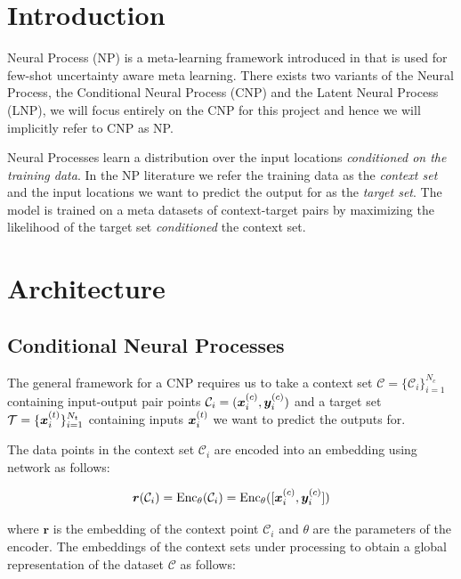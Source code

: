 \documentclass[../../main.tex]{subfiles}
\begin{document}
\section{Introduction}

Neural Process (NP) is a meta-learning framework introduced in \parencite{garnelo2018conditional, garnelo2018neural} that is used for few-shot uncertainty aware meta learning. There exists two variants of the Neural Process, the Conditional Neural Process (CNP) and the Latent Neural Process (LNP), we will focus entirely on the CNP for  this project and hence we will implicitly refer to CNP as NP. 

Neural Processes learn a distribution over the input locations \emph{conditioned on the training data}. In the NP literature we refer the training data as the \emph{context set} and the input locations we want to predict the output for as the \emph{target set}. The model is trained on a meta datasets of context-target pairs by maximizing the likelihood of the target set \emph{conditioned} the context set. 
\section{Architecture}

\subsection{Conditional Neural Processes}

The general framework for a CNP requires us to take a context set $\mathcal{C} = \{ \mathcal{C}_i \}_{i=1}^{N_c}$ containing input-output pair points  $\mathcal{C}_i = (\bm{x}_{i}^{(c)}, \bm{y}_i^{(c)}) $ and a target set $\mathcal{T} = \{ \bm{x}_{i}^{(t)} \}_{i=1}^{N_t}$ containing inputs $\bm{x}_{i}^{(t)}$ we want to predict the outputs for.

The data points in the context set $\mathcal{C}_i$ are encoded into an embedding using network as follows:


\begin{equation}
    \bm{r}(\mathcal{C}_i) = \text{Enc}_\theta(\mathcal{C}_i) = \text{Enc}_\theta( [\bm{x}_{i}^{(c)}, \bm{y}_i^{(c)}] )
\end{equation}

where $\bm{r}$ is the embedding of the context point $\mathcal{C}_i$ and $\theta$ are the parameters of the encoder. The embeddings of the context sets under processing to obtain a global representation of the dataset $\mathcal{C}$ as follows: 
\end{document}
